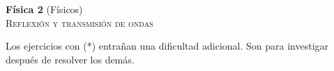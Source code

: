 \documentclass[11pt,spanish,a4paper]{article}
\begin{document}
\begin{center}
\textbf{Física 2} (Físicos) \hfill {}\\
	\textsc{\LARGE Reflexión y transmisión de ondas}
\end{center}

Los ejercicios con (*) entrañan una dificultad adicional. Son para investigar después de resolver los demás.


\begin{enumerate}

}

\end{enumerate}
\end{document}
